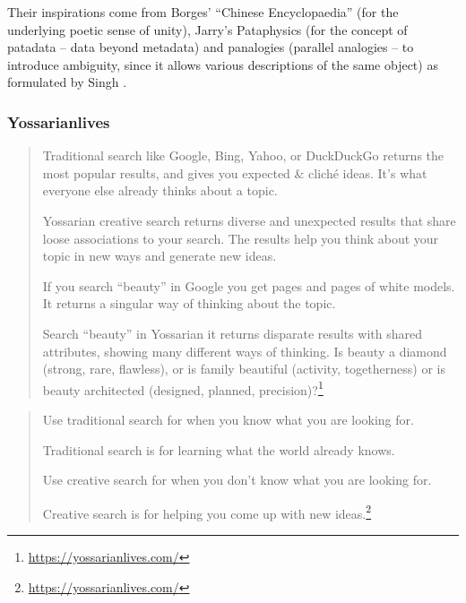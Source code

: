 Their inspirations come from Borges' ``Chinese Encyclopaedia'' \citep{Borges2000} (for the underlying poetic sense of unity), Jarry's Pataphysics \citep{Jarry1996} (for the concept of patadata – data beyond metadata) and  panalogies (parallel analogies – to introduce ambiguity, since it allows various descriptions of the same object) as formulated by Singh \citep{Singh2005}.


\subsubsection*{Yossarianlives}

\begin{quote}
  Traditional search like Google, Bing, Yahoo, or DuckDuckGo returns the most popular results, and gives you expected \& cliché ideas. It's what everyone else already thinks about a topic.

  Yossarian creative search returns diverse and unexpected results that share loose associations to your search. The results help you think about your topic in new ways and generate new ideas.

  If you search ``beauty'' in Google you get pages and pages of white models. It returns a singular way of thinking about the topic.

  Search ``beauty'' in Yossarian it returns disparate results with shared attributes, showing many different ways of thinking. Is beauty a diamond (strong, rare, flawless), or is family beautiful (activity, togetherness) or is beauty architected (designed, planned, precision)?\footnote{\url{https://yossarianlives.com/}}
\end{quote}

\begin{quote}
  Use traditional search for when you know what you are looking for.

  Traditional search is for learning what the world already knows.

  Use creative search for when you don't know what you are looking for.

  Creative search is for helping you come up with new ideas.\footnote{\url{https://yossarianlives.com/}}
\end{quote}

